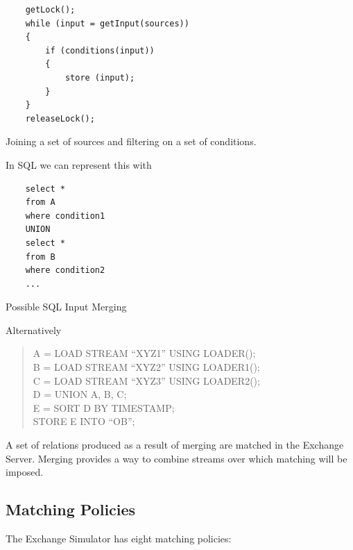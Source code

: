 \documentclass{article}
\begin{document}
\begin{program}
    \begin{verbatim}   
    getLock();
    while (input = getInput(sources))
    {
        if (conditions(input))
        {
            store (input);
        }
    }
    releaseLock();
    \end{verbatim}
\caption{Joining a set of sources and filtering on a set of conditions.}
\end{program}

In SQL we can represent this with 

\begin{program}
    \begin{verbatim}   
    select *
    from A
    where condition1
    UNION
    select *
    from B
    where condition2
    ...
    \end{verbatim}
\caption{Possible SQL Input Merging}
\end{program}

Alternatively 

\begin{quote}
A = LOAD STREAM {}``XYZ1'' USING LOADER();\\
B = LOAD STREAM {}``XYZ2'' USING LOADER1();\\
C = LOAD STREAM {}``XYZ3'' USING LOADER2();\\

D = UNION A, B, C;\\
E = SORT D BY TIMESTAMP;\\
STORE E INTO {}``OB'';
\end{quote}


A set of relations produced as a result of merging are matched in the Exchange Server. Merging provides a way to combine streams over which matching will be imposed. 

\subsection{Matching Policies}

The Exchange Simulator has eight matching policies:
\end{document}
